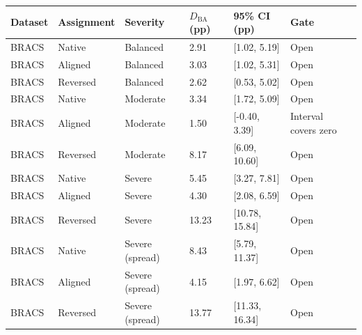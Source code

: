 \begin{tabular}{llllll}
\toprule
Dataset & Assignment & Severity & $D_{\mathrm{BA}}$ (pp) & 95\% CI (pp) & Gate \\
\midrule
BRACS & Native & Balanced & 2.91 & [1.02, 5.19] & Open \\
BRACS & Aligned & Balanced & 3.03 & [1.02, 5.31] & Open \\
BRACS & Reversed & Balanced & 2.62 & [0.53, 5.02] & Open \\
BRACS & Native & Moderate & 3.34 & [1.72, 5.09] & Open \\
BRACS & Aligned & Moderate & 1.50 & [-0.40, 3.39] & Interval covers zero \\
BRACS & Reversed & Moderate & 8.17 & [6.09, 10.60] & Open \\
BRACS & Native & Severe & 5.45 & [3.27, 7.81] & Open \\
BRACS & Aligned & Severe & 4.30 & [2.08, 6.59] & Open \\
BRACS & Reversed & Severe & 13.23 & [10.78, 15.84] & Open \\
BRACS & Native & Severe (spread) & 8.43 & [5.79, 11.37] & Open \\
BRACS & Aligned & Severe (spread) & 4.15 & [1.97, 6.62] & Open \\
BRACS & Reversed & Severe (spread) & 13.77 & [11.33, 16.34] & Open \\
\bottomrule
\end{tabular}
